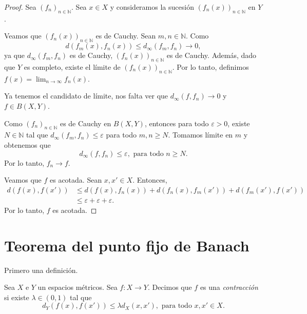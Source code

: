 \begin{proof}
	Sea $(f_n)_{n \in \mathbb{N}}$. Sea $x \in X$ y consideramos la sucesión $(f_n (x))_{n \in \mathbb{N}}$ en $Y$.

	Veamos que $(f_n (x))_{n \in \mathbb{N}}$ es de Cauchy. Sean $m, n \in \mathbb{N}$. Como
	\begin{equation*}
		d(f_m (x), f_n (x)) \leq d_{\infty} (f_m, f_n) \longrightarrow 0,
	\end{equation*}
	ya que $d_{\infty} (f_m, f_n)$ es de Cauchy, $(f_n (x))_{n \in \mathbb{N}}$ es de Cauchy. Además, dado que $Y$ es completo, existe el límite de $(f_n(x))_{n \in \mathbb{N}}$. Por lo tanto, definimos $f(x) = \lim_{n \to \infty} f_n (x)$.

	Ya tenemos el candidato de límite, nos falta ver que $d_{\infty}(f, f_n) \longrightarrow 0$ y $f \in B(X, Y)$.

	Como $(f_n)_{n \in \mathbb{N}}$ es de Cauchy en $B(X, Y)$, entonces para todo $\varepsilon > 0$, existe $N \in \mathbb{N}$ tal que $d_{\infty} (f_m, f_n) \leq \varepsilon$ para todo $m, n \geq N$. Tomamos límite en $m$ y obtenemos que
	\begin{equation*}
		d_{\infty} (f, f_n) \leq \varepsilon, \text{ para todo } n \geq N.
	\end{equation*}
	Por lo tanto, $f_n \longrightarrow f$.

	Veamos que $f$ es acotada. Sean $x, x' \in X$. Entonces,
	\begin{align*}
		d(f(x), f(x')) & \leq d(f(x), f_n (x)) + d(f_n (x), f_m (x')) + d(f_m(x'), f(x')) \\
		               & \leq \varepsilon + \varepsilon + \varepsilon.
	\end{align*}
	Por lo tanto, $f$ es acotada.
\end{proof}

\section{Teorema del punto fijo de Banach}

Primero una definición.

\begin{definition}
	Sea $X$ e $Y$ un espacios métricos. Sea $f : X \to Y$. Decimos que $f$ es una \emph{contracción} si existe $\lambda \in (0, 1)$ tal que
	\begin{equation*}
		d_Y(f(x), f(x')) \leq \lambda d_X(x, x'), \text{ para todo }x, x' \in X.
	\end{equation*}
\end{definition}

